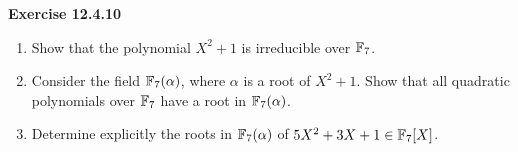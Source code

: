 \documentclass{article}
\begin{document}
\pagebreak

\begin{homeworkProblem}
    \textbf{Exercise 12.4.10} 
    \begin{enumerate}
        \item Show that the polynomial $X^2 + 1$ is irreducible over $\mathbb{F}_7$.
        \item Consider the field $\mathbb{F}_7 (\alpha)$, where $\alpha$ is a root of $X^2 + 1$.
            Show that all quadratic polynomials over $\mathbb{F}_7$ have a root in $\mathbb{F}_7 (\alpha)$.
        \item Determine explicitly the roots in $\mathbb{F}_7(\alpha)$ of $5 X^2 + 3 X + 1 \in \mathbb{F}_7 [X]$.
    \end{enumerate}
    
    \solution \\

\end{homeworkProblem}
\end{document}
